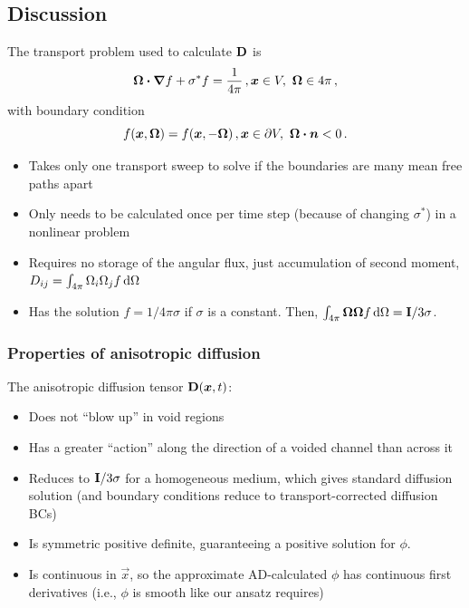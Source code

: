\documentclass{beamer}
\begin{document}
\subsection{Discussion}
\begin{frame}
  The transport problem used to calculate $\mathbf{D}$ is
  \begin{equation*}
    \bm{\Omega}\bm{\cdot} \bm{\nabla} f + \sigma^* f = \frac{1}{4\pi} \,, \bm{x} \in V,\
    \bm{\Omega}\in 4\pi\,,
  \end{equation*}
  with boundary condition
  \begin{equation*}
    f(\bm{x}, \bm{\Omega}) = f(\bm{x}, -\bm{\Omega}) \,, \bm{x} \in
    \partial V,\ \bm{\Omega} \bm{\cdot} \bm{n} < 0\,.
  \end{equation*}
  \vspace{-\baselineskip}
  \begin{itemize}
    \item Takes only one transport sweep to solve if the boundaries are many
      mean free paths apart
    \item Only needs to be calculated once per time step (because of changing
      $\sigma^*$) in a nonlinear problem \item Requires no storage of the
      angular flux, just accumulation of second moment, $D_{ij} =
      \int_{4\pi} \Omega_i \Omega_j f \mathop{}\!\mathrm{d}\Omega$
    \item Has the solution $f=1/4\pi\sigma$ if $\sigma$ is a constant.
      Then, $\int_{4\pi} \bm{\Omega} \bm{\Omega} f \mathop{}\!\mathrm{d}\Omega =
      \mathbf{I}/3\sigma$.
  \end{itemize}
\end{frame}

\begin{frame}
  \frametitle{Properties of anisotropic diffusion}

  The anisotropic diffusion tensor $\mathbf{D}(\bm{x},t)$: 
  \begin{itemize}
    \item Does not ``blow up'' in void regions
    \item Has a greater ``action'' along the direction of a voided channel than
      across it
    \item Reduces to $\mathbf{I}/3\sigma$ for a homogeneous
      medium, which gives standard diffusion solution (and boundary conditions
      reduce to transport-corrected diffusion BCs)
    \item Is symmetric positive definite, guaranteeing a positive solution
      for $\phi$.
    \item Is continuous in $\vec{x}$, so the approximate AD-calculated $\phi$
      has continuous first derivatives (i.e., $\phi$ is smooth like our ansatz
      requires)
  \end{itemize}

\end{frame}
\end{document}
